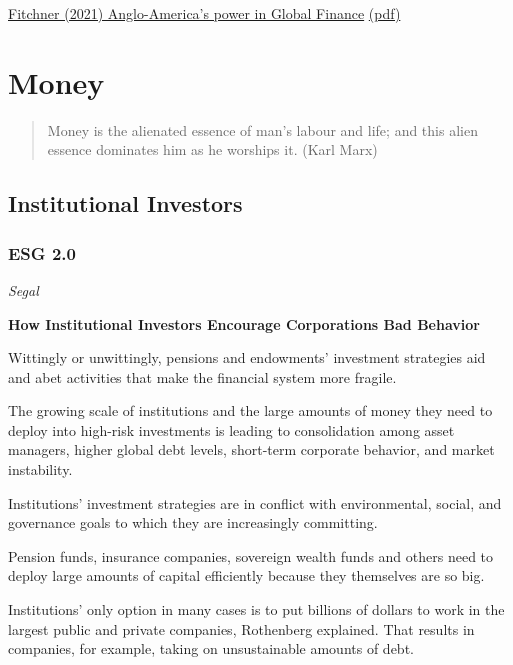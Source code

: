 \documentclass[
]{book}
\begin{document}
\href{https://www.cambridge.org/core/journals/review-of-international-studies/article/perpetual-decline-or-persistent-dominance-uncovering-angloamericas-true-structural-power-in-global-finance/75536FC7435F72FC9AB4968D0509F019}{Fitchner (2021) Anglo-America's power in Global Finance}
\href{pdf/Fitchner_2021_anglo-americas-power-in-global-finance.pdf}{(pdf)}

\hypertarget{money}{%
\section{Money}\label{money}}

\begin{quote}
Money is the alienated essence of man's labour and life; and this alien essence dominates him as he worships it. (Karl Marx)
\end{quote}

\hypertarget{institutional-investors}{%
\subsection{Institutional Investors}\label{institutional-investors}}

\hypertarget{esg-2.0}{%
\subsubsection{ESG 2.0}\label{esg-2.0}}

\emph{Segal}

\textbf{How Institutional Investors Encourage Corporations Bad Behavior}

Wittingly or unwittingly, pensions and endowments' investment strategies aid and abet activities that make the financial system more fragile.

The growing scale of institutions and the large amounts of money they need to deploy into high-risk investments is leading to consolidation among asset managers, higher global debt levels, short-term corporate behavior, and market instability.

Institutions' investment strategies are in conflict with environmental, social, and governance goals to which they are increasingly committing.

Pension funds, insurance companies, sovereign wealth funds and others need to deploy large amounts of capital efficiently because they themselves are so big.

Institutions' only option in many cases is to put billions of dollars to work in the largest public and private companies, Rothenberg explained. That results in companies, for example, taking on unsustainable amounts of debt.
\end{document}
